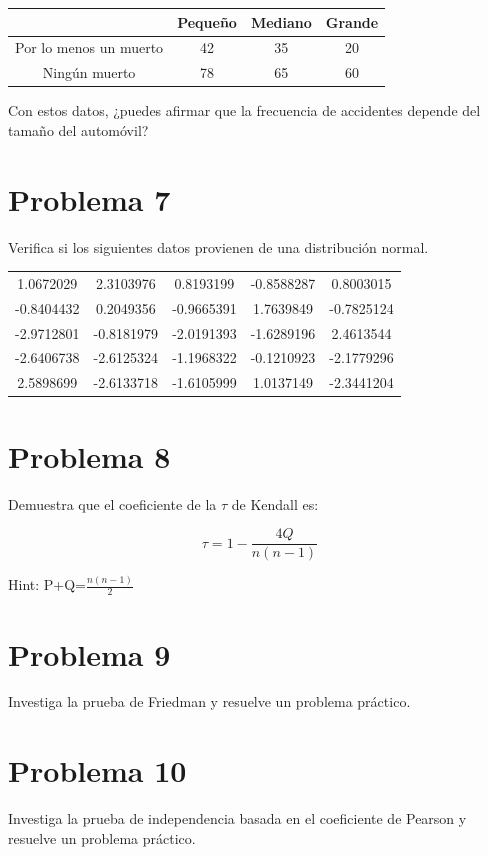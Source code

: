 \documentclass{article}
\begin{document}
\begin{center}
    \begin{tabular}{c| c c c}
                               & Pequeño & Mediano & Grande \\
        \hline
        Por lo menos un muerto & 42      & 35      & 20     \\
        Ningún muerto          & 78      & 65      & 60     \\
    \end{tabular}
\end{center}

Con estos datos,  ¿puedes afirmar que la frecuencia de accidentes depende del  tamaño del automóvil?

\section{Problema 7}

Verifica si los siguientes datos provienen de una distribución normal.
\begin{center}
    \begin{tabular}{c c c c c}
        1.0672029  & 2.3103976  & 0.8193199  & -0.8588287 & 0.8003015  \\
        -0.8404432 & 0.2049356  & -0.9665391 & 1.7639849  & -0.7825124 \\
        -2.9712801 & -0.8181979 & -2.0191393 & -1.6289196 & 2.4613544  \\
        -2.6406738 & -2.6125324 & -1.1968322 & -0.1210923 & -2.1779296 \\
        2.5898699  & -2.6133718 & -1.6105999 & 1.0137149  & -2.3441204 \\
    \end{tabular}
\end{center}

\section{Problema 8}

Demuestra que el coeficiente de la $\tau$ de Kendall es:

$$\tau=1-\frac{4Q}{n(n-1)}$$

Hint: P+Q=$\frac{n(n-1)}{2}$

\section{Problema 9}

Investiga la prueba de Friedman y resuelve un problema práctico.

\section{Problema 10}

Investiga la prueba de independencia basada en el coeficiente de Pearson y resuelve un problema práctico.
\end{document}
